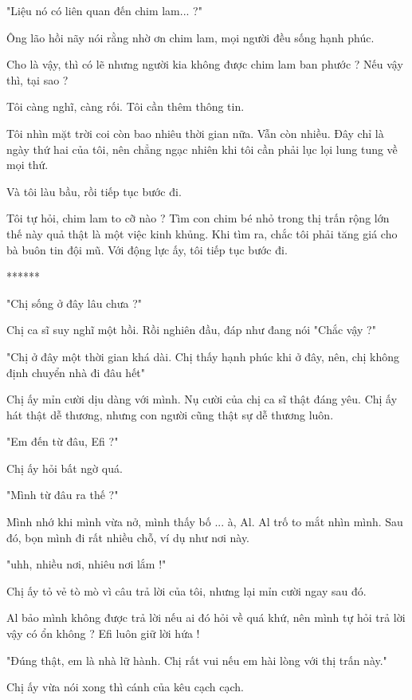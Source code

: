 "Liệu nó có liên quan đến chim lam... ?"

Ông lão hồi nãy nói rằng nhờ ơn chim lam, mọi người đều sống hạnh phúc.

Cho là vậy, thì có lẽ nhưng người kia không được chim lam ban phước ? Nếu vậy thì, tại sao ?

Tôi càng nghĩ, càng rối. Tôi cần thêm thông tin.

Tôi nhìn mặt trời coi còn bao nhiêu thời gian nữa. Vẫn còn nhiều. Đây chỉ là ngày thứ hai của tôi, nên chẳng ngạc nhiên khi tôi cần phải lục lọi lung tung về mọi thứ.

Và tôi làu bầu, rồi tiếp tục bước đi.

Tôi tự hỏi, chim lam to cỡ nào ? Tìm con chim bé nhỏ trong thị trấn rộng lớn thế này quả thật là một việc kinh khủng. Khi tìm ra, chắc tôi phải tăng giá cho bà buôn tin đội mũ. Với động lực ấy, tôi tiếp tục bước đi. \\


 \begin{center}
 	******
 \end{center}

"Chị sống ở đây lâu chưa ?"

Chị ca sĩ suy nghĩ một hồi. Rồi nghiên đầu, đáp như đang nói "Chắc vậy ?"

"Chị ở đây một thời gian khá dài. Chị thấy hạnh phúc khi ở đây, nên, chị không định chuyển nhà đi đâu hết"

Chị ấy mỉn cười dịu dàng với mình. Nụ cười của chị ca sĩ thật đáng yêu. Chị ấy hát thật dễ thương, nhưng con người cũng thật sự dễ thương luôn.

"Em đến từ đâu, Efi ?"

Chị ấy hỏi bất ngờ quá.

"Mình từ đâu ra thế ?"

Mình nhớ khi mình vừa nở, mình thấy bố ... à, Al. Al trố to mắt nhìn mình. Sau đó, bọn mình đi rất nhiều chỗ, ví dụ như nơi này.

"uhh, nhiều nơi, nhiêu nơi lắm !"

Chị ấy tỏ vẻ tò mò vì câu trả lời của tôi, nhưng lại mỉn cười ngay sau đó. 

Al bảo mình không được trả lời nếu ai đó hỏi về quá khứ, nên mình tự hỏi trả lời vậy có ổn không ? Efi luôn giữ lời hứa !

"Đúng thật, em là nhà lữ hành. Chị rất vui nếu em hài lòng với thị trấn này."

Chị ấy vừa nói xong thì cánh của kêu cạch cạch.

